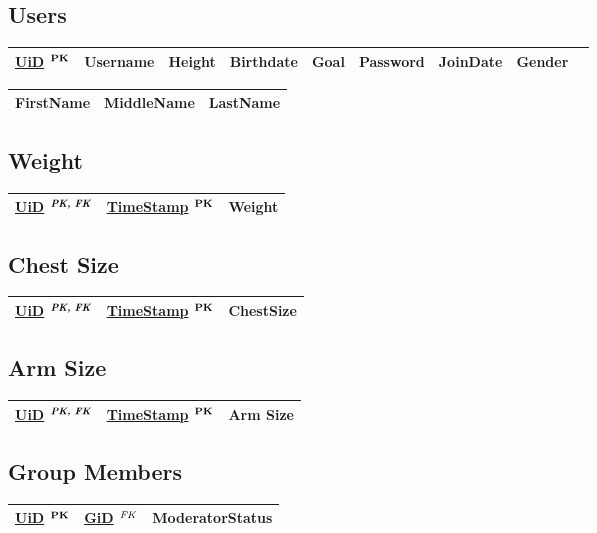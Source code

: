 \documentclass{article}
\newcommand{\pk}{$^{\text{\textbf{PK}}}$}
\newcommand{\fk}{$^{\text{\textit{FK}}}$}
\newcommand{\pfk}{$^{\text{\textit{\textbf{PK, FK}}}}$}
\begin{document}
\subsection*{Users}
\begin{tabular}{|l|l|l|l|l|l|l|l|l|}
\hline
\underline{UiD} \pk & Username & Height & Birthdate & Goal & Password & JoinDate & Gender\\
\hline
\end{tabular}
\begin{tabular}{|l|l|l|}
\hline
FirstName & MiddleName & LastName \\
\hline
\end{tabular}

\begin{multicols}{2}
\subsection*{Weight}
\begin{tabular}{|l|l|l|}
\hline
\underline{UiD} \pfk & \underline{TimeStamp} \pk & Weight \\
\hline
\end{tabular}

\subsection*{Chest Size}
\begin{tabular}{|l|l|l|}
\hline
\underline{UiD} \pfk & \underline{TimeStamp} \pk & ChestSize\\
\hline
\end{tabular}

\subsection*{Arm Size}
\begin{tabular}{|l|l|l|}
\hline
\underline{UiD} \pfk & \underline{TimeStamp} \pk & Arm Size \\
\hline
\end{tabular}
\end{multicols}

\subsection*{Group Members}
\begin{tabular}{|l|l|l|}
\hline
\underline{UiD} \pk & \underline{GiD} \fk & ModeratorStatus \\
\hline
\end{tabular}
\end{document}
